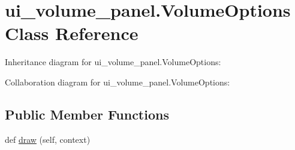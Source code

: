\hypertarget{classui__volume__panel_1_1VolumeOptions}{}\section{ui\+\_\+volume\+\_\+panel.\+Volume\+Options Class Reference}
\label{classui__volume__panel_1_1VolumeOptions}


 




Inheritance diagram for ui\+\_\+volume\+\_\+panel.\+Volume\+Options\+:


Collaboration diagram for ui\+\_\+volume\+\_\+panel.\+Volume\+Options\+:
\subsection*{Public Member Functions}
\begin{DoxyCompactItemize}
\item 
def \hyperlink{classui__volume__panel_1_1VolumeOptions_a2d452aa54a2d66c89ecfa4b8773a1cab}{draw} (self, context)
\end{DoxyCompactItemize}
